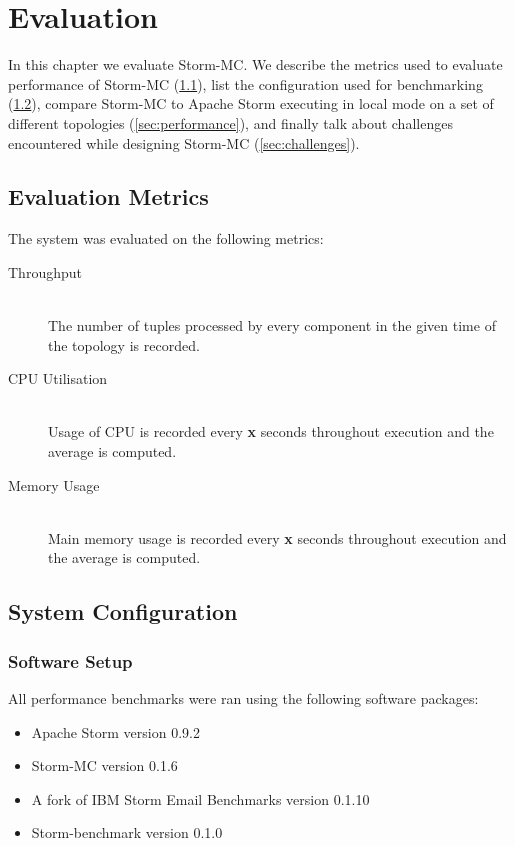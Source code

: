 \chapter{Evaluation}

In this chapter we evaluate Storm-MC. We describe the metrics used to evaluate performance of Storm-MC (\ref{sec:metrics}), list the configuration used for benchmarking (\ref{sec:system_conf}), compare Storm-MC to Apache Storm executing in local mode on a set of different topologies (\ref{sec:performance}), and finally talk about challenges encountered while designing Storm-MC (\ref{sec:challenges}).

\section{Evaluation Metrics}
\label{sec:metrics}

The system was evaluated on the following metrics:

\begin{description}
	\item[Throughput] \hfill \\
	The number of tuples processed by every component in the given time of the topology is recorded.
	\item[CPU Utilisation] \hfill \\
	Usage of CPU is recorded every \textbf{x} seconds throughout execution and the average is computed.
	\item[Memory Usage] \hfill \\
	Main memory usage is recorded every \textbf{x} seconds throughout execution and the average is computed.
\end{description}

\section{System Configuration}
\label{sec:system_conf}

\subsection{Software Setup}

All performance benchmarks were ran using the following software packages:

\begin{itemize}
	\item Apache Storm version 0.9.2
	\item Storm-MC version 0.1.6
	\item A fork of IBM Storm Email Benchmarks version 0.1.10
	\item Storm-benchmark version 0.1.0
\end{itemize}

